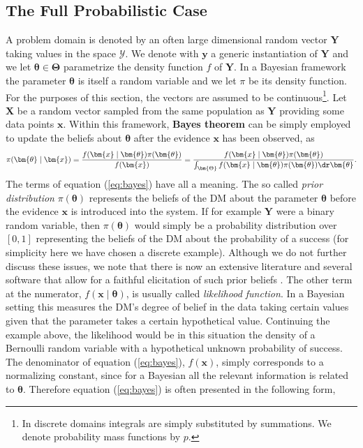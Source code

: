 \subsection{The Full Probabilistic Case}
A problem domain is denoted by an often large dimensional random vector
 $\bm{Y}$ taking values in the space $\bm{\mathcal{Y}}$. We denote with $\bm{y}$ a generic instantiation of $\bm{Y}$ and we let $\bm{\theta}\in\bm{\Theta}$ parametrize the density function $f$ of $\bm{Y}$. In a Bayesian framework the parameter $\bm{\theta}$ is itself a random variable and we let $\pi$ be its density function. For the purposes of this section, the vectors are assumed to be continuous\footnote{In discrete domains integrals are simply substituted by summations. We denote probability mass functions by $p$.}.  Let $\bm{X}$ be a random vector sampled from the same population as $\bm{Y}$ providing some data points $\bm{x}$. Within this framework, \textbf{Bayes theorem} can be  simply  employed to update the beliefs about $\bm{\theta}$ after the evidence $\bm{x}$ has been observed, as 
\begin{equation}
\label{eq:bayes}
\pi(\bm{\theta}\;|\;\bm{x})=\frac{f(\bm{x}\;|\;\bm{\theta})\pi(\bm{\theta})}{f(\bm{x})}=\frac{f(\bm{x}\;|\;\bm{\theta})\pi(\bm{\theta})}{\int_{\bm{\Theta}}f(\bm{x}\;|\;\bm{\theta})\pi(\bm{\theta})\dr \bm{\theta}}.
\end{equation}
The terms of equation (\ref{eq:bayes}) have all a meaning. The so called \textit{prior distribution} $\pi(\bm{\theta})$ represents the beliefs of the \gls{DM} about the parameter $\bm{\theta}$ before the evidence $\bm{x}$ is introduced into the system. If for example $\bm{Y}$ were a binary random variable, then $\pi(\bm{\theta})$ would simply be a probability distribution over $[0,1]$ representing the beliefs of the \gls{DM} about the probability of a success (for simplicity here we have chosen a discrete example). Although we do not further discuss these issues, we note that there is now an extensive literature and several software that allow for a faithful elicitation of such prior beliefs \citep[see for example][]{O'Hagan2006a}. The other term at the numerator, $f(\bm{x}\;|\;\bm{\theta})$, is usually called \textit{likelihood function}. In a Bayesian setting this measures the \gls{DM}'s degree of belief in the data taking certain values given that the parameter takes a certain hypothetical value. Continuing the example above, the likelihood would be in this situation the density of a Bernoulli random variable with a hypothetical unknown probability of success. The denominator of equation (\ref{eq:bayes}), $f(\bm{x})$,  simply corresponds to a normalizing constant, since for a Bayesian all the relevant information is related to $\bm{\theta}$. Therefore equation (\ref{eq:bayes}) is often presented in the following form,
